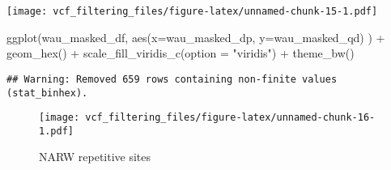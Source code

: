 \documentclass[
]{article}
\newenvironment{Shaded}{\begin{snugshade}}{\end{snugshade}}
\newcommand{\AttributeTok}[1]{\textcolor[rgb]{0.77,0.63,0.00}{#1}}
\newcommand{\FunctionTok}[1]{\textcolor[rgb]{0.00,0.00,0.00}{#1}}
\newcommand{\NormalTok}[1]{#1}
\newcommand{\SpecialCharTok}[1]{\textcolor[rgb]{0.00,0.00,0.00}{#1}}
\newcommand{\StringTok}[1]{\textcolor[rgb]{0.31,0.60,0.02}{#1}}
\begin{document}
\texttt{[image: vcf\_filtering\_files/figure-latex/unnamed-chunk-15-1.pdf]}

\begin{Shaded}
\begin{Highlighting}[]
\FunctionTok{ggplot}\NormalTok{(wau\_masked\_df, }\FunctionTok{aes}\NormalTok{(}\AttributeTok{x=}\NormalTok{wau\_masked\_dp, }\AttributeTok{y=}\NormalTok{wau\_masked\_qd) ) }\SpecialCharTok{+}
  \FunctionTok{geom\_hex}\NormalTok{() }\SpecialCharTok{+}
  \FunctionTok{scale\_fill\_viridis\_c}\NormalTok{(}\AttributeTok{option =} \StringTok{"viridis"}\NormalTok{) }\SpecialCharTok{+}
  \FunctionTok{theme\_bw}\NormalTok{()}
\end{Highlighting}
\end{Shaded}

\begin{verbatim}
## Warning: Removed 659 rows containing non-finite values (stat_binhex).
\end{verbatim}

\begin{figure}
\centering
\texttt{[image: vcf\_filtering\_files/figure-latex/unnamed-chunk-16-1.pdf]}
\caption{NARW repetitive sites}
\end{figure}
\end{document}
